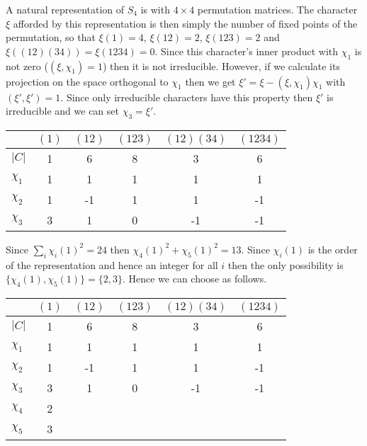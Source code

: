 \documentclass[11pt]{article} \usepackage{amssymb}
\begin{document}
A natural representation of $S_4$ is with $4 \times 4$ permutation
matrices. The character $\xi$ afforded by this representation is then
simply the number of fixed points of the permutation, so that
$\xi(1)=4$, $\xi(12) = 2$, $\xi(123) = 2$ and
$\xi((12)(34))=\xi(1234)=0$. Since this character's inner product with
$\chi_1$ is not zero ($(\xi,\chi_1) = 1$) then it is not
irreducible. However, if we calculate its projection on the space
orthogonal to $\chi_1$ then we get $\xi' = \xi - (\xi,\chi_1)\chi_1$
with $(\xi',\xi')=1$. Since only irreducible characters have this
property then $\xi'$ is irreducible and we can set $\chi_3=\xi'$.
\begin{table}[h]
\begin{center}
{\small
\begin{tabular}{ l | c | c | c | c | c }
  & $(1)$ & $(12)$ & $(123)$ & $(12)(34)$ & $(1234)$ \\
\hline
$|C|$ & 1 & 6 & 8 & 3 & 6\\
\hline
$\chi_1$ & 1 & 1 & 1 & 1 & 1\\
$\chi_2$ & 1 & -1 & 1 & 1 & -1\\
$\chi_3$ & 3 & 1 & 0 & -1 & -1\\
\end{tabular}
}
\end{center}
\end{table}

\pagebreak
Since $\sum_i\chi_i(1)^2=24$ then $\chi_4(1)^2+\chi_5(1)^2 =
13$. Since $\chi_i(1)$ is the order of the representation and hence an
integer for all $i$ then the only possibility is
$\{\chi_4(1),\chi_5(1)\}=\{2,3\}$. Hence we can choose as follows.
\begin{table}[h]
\begin{center}
{\small
\begin{tabular}{ l | c | c | c | c | c }
  & $(1)$ & $(12)$ & $(123)$ & $(12)(34)$ & $(1234)$ \\
\hline
$|C|$ & 1 & 6 & 8 & 3 & 6\\
\hline
$\chi_1$ & 1 & 1 & 1 & 1 & 1\\
$\chi_2$ & 1 & -1 & 1 & 1 & -1\\
$\chi_3$ & 3 & 1 & 0 & -1 & -1\\
$\chi_4$ & 2 & & & &\\
$\chi_5$ & 3 & & & &\\
\end{tabular}
}
\end{center}
\end{table}
\end{document}
